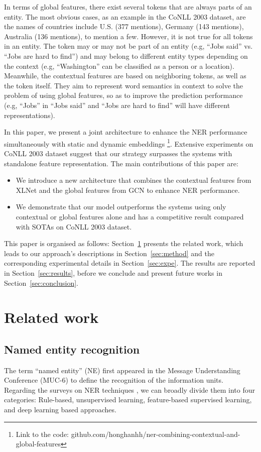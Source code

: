 \documentclass[runningheads]{llncs}
\begin{document}
In terms of global features, there exist several tokens that are always parts of an entity. 
The most obvious cases, as an example in the CoNLL 2003 dataset,  are the names of countries include U.S. (377 mentions), Germany (143 mentions), Australia (136 mentions), to mention a few. However, it is not true for all tokens in an entity. The token may or may not be part of an entity (e.g, ``Jobs said'' vs. ``Jobs are hard to find'') and may belong to different entity types depending on the context (e.g, ``Washington'' can be classified as a person or a location). Meanwhile, the contextual features are based on neighboring tokens, as well as the token itself. They aim to represent word semantics in context to solve the problem of using global features, so as to improve the prediction performance (e.g, ``Jobs'' in ``Jobs said'' and ``Jobs are hard to find'' will have different representations).



In this paper, we present a joint architecture to enhance the NER performance simultaneously with static and dynamic embeddings \footnote{Link to the code: github.com/honghanhh/ner-combining-contextual-and-global-features}. Extensive experiments on CoNLL 2003 dataset suggest that our strategy surpasses the systems with standalone feature representation. The main contributions of this paper are: \begin{itemize}
    \item We introduce a new architecture that combines the contextual features from XLNet and the global features from GCN to enhance NER performance.
    \item We demonstrate that our model outperforms the systems using only contextual or global features alone and has a competitive result compared with SOTAs on CoNLL 2003 dataset.
\end{itemize}

This paper is organised as follows: Section~\ref{sec:sota} presents the related work, which leads to our approach's descriptions in Section~\ref{sec:method} and the corresponding experimental details in Section~\ref{sec:expe}. The results are reported in Section~\ref{sec:results}, before we conclude and present future works in Section~\ref{sec:conclusion}.
\vspace{-0.2cm}
\section{Related work}
\label{sec:sota}
\subsection{Named entity recognition}
The term “named entity” (NE) first appeared in the  Message Understanding Conference (MUC-6) \cite{grishman1996message} to define the recognition of the information units. Regarding the surveys on NER techniques \cite{palshikar2013techniques,yadav2019survey,li2020survey}, we can broadly divide them into four categories: Rule-based, unsupervised learning, feature-based supervised learning, and deep learning based approaches.
\end{document}
